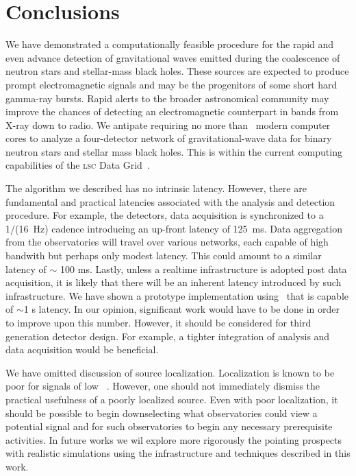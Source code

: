\section{Conclusions}
\label{SECV}\label{sec:conclusions}

%
We have demonstrated a computationally feasible procedure for the rapid and even advance
detection of gravitational waves emitted during the coalescence of neutron
stars and stellar-mass black holes.  These sources are expected to produce
prompt electromagnetic signals and may be the progenitors of some short hard
gamma-ray bursts.  Rapid alerts to the broader astronomical community may
improve the chances of detecting an electromagnetic counterpart in bands from
X-ray down to radio.  We antipate requiring no more than \numcpus\ modern
%
%
%
computer cores to analyze a four-detector network of gravitational-wave data
for binary neutron stars and stellar mass black holes.  This is within the
current computing capabilities of the \textsc{lsc} Data Grid~\cite{LDG}.

The algorithm we described has no intrinsic latency.  However, there are
fundamental and practical latencies associated with the analysis and detection
procedure. For example, the \LIGO{} detectors, data acquisition is synchronized
to a 1/(16~Hz) cadence introducing an up-front latency of 125~ms.  Data
%
%
%
aggregation from the observatories will travel over various networks, each
capable of high bandwith but perhaps only modest latency.  This could amount to
a similar latency of $\sim$ 100 ms.  Lastly, unless a realtime infrastructure is
adopted post data acquisition, it is likely that there will be an inherent
latency introduced by such infrastructure.  We have shown a prototype
implementation using \gstlal\ that is capable of $\sim$1 s latency. In our
opinion, significant work would have to be done in order to improve upon this
number. However, it should be considered for third generation detector design.
For example, a tighter integration of analysis and data acquisition would be
beneficial.

%
We have omitted discussion of source localization. Localization is known to
be poor for signals of low \SNR~\cite{Fairhurst2009}.
However, one should not immediately dismiss the practical usefulness of a
poorly localized source. Even with poor localization, it should be possible to
begin downselecting what observatories could view a potential signal and for
such observatories to begin any necessary prerequisite activities. In future
works we wil explore more rigorously the pointing prospects with realistic
simulations using the infrastructure and techniques described in this work.

